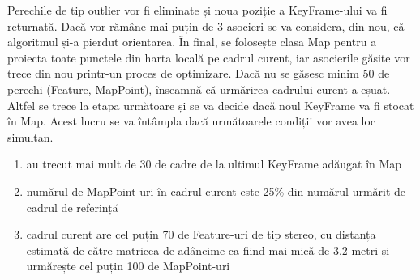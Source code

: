 \documentclass[12pt,a4paper]{report}
\begin{document}
Perechile de tip outlier vor fi eliminate și noua poziție a KeyFrame-ului va fi returnată. Dacă 
vor rămâne mai puțin de 3 asocieri se va considera, din nou, că algoritmul și-a pierdut orientarea.
În final, se folosește clasa Map pentru a proiecta toate punctele din harta locală pe cadrul curent,
iar asocierile găsite vor trece din nou printr-un proces de optimizare. Dacă nu se găsesc minim
50 de perechi (Feature, MapPoint), înseamnă că urmărirea cadrului curent a eșuat. Altfel se 
trece la etapa următoare și se va decide dacă  noul KeyFrame va fi stocat în Map. Acest lucru 
se va întâmpla dacă următoarele condiții vor avea loc simultan.    
\begin{enumerate}
    \item au trecut mai mult de 30 de cadre de la ultimul KeyFrame adăugat în Map
    \item numărul de MapPoint-uri în cadrul curent este 25\% din numărul urmărit de cadrul de referință
    \item cadrul curent are cel puțin 70 de Feature-uri de tip stereo, cu distanța estimată de către matricea de adâncime 
    ca fiind mai mică de 3.2 metri și urmărește cel puțin 100 de MapPoint-uri
\end{enumerate}
\end{document}
